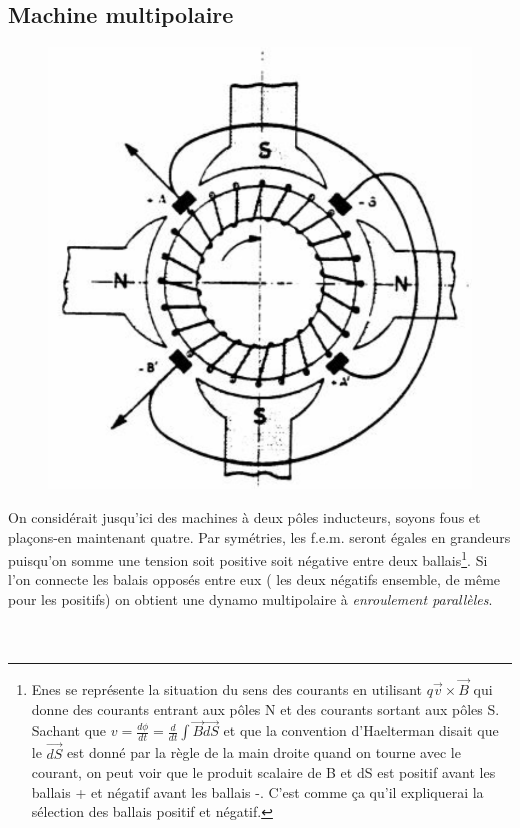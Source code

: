 	
	\subsection{Machine multipolaire}
	\begin{figure}
	\vspace{-5mm}
	\includegraphics[scale=0.3]{ch4/image2p.png}
	\end{figure}
	On considérait jusqu'ici des machines à deux pôles inducteurs, soyons 
	fous et plaçons-en maintenant quatre. Par symétries, les f.e.m. seront 
	égales en grandeurs puisqu'on somme une tension soit positive soit négative 
	entre deux ballais\footnote{Enes se représente la situation du sens des courants en utilisant $q\vec{v}\times \vec{B}$ qui donne des courants entrant aux pôles N et des courants sortant aux pôles S. Sachant que $v = \frac{d\phi}{dt} = \frac{d}{dt}\int \vec{B} \vec{dS}$ et que la convention d'Haelterman disait que le $\vec{dS}$ est donné par la règle de la main droite quand on tourne avec le courant, on peut voir que le produit scalaire de B et dS est positif avant les ballais + et négatif avant les ballais -. C'est comme ça qu'il expliquerai la sélection des ballais positif et négatif.}. Si l'on connecte les balais opposés entre eux (
	les deux négatifs ensemble, de même pour les positifs) on obtient une 
	dynamo multipolaire à \textit{enroulement parallèles}. \\\\\\
	
